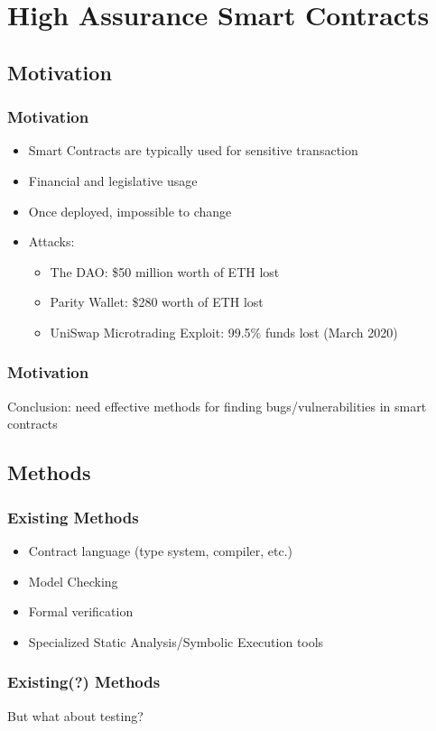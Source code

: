 \section{High Assurance Smart Contracts}

\subsection{Motivation}

\begin{frame}
\frametitle{Motivation}
\begin{itemize}
    \item Smart Contracts are typically used for sensitive transaction
    \item Financial and legislative usage
    \item Once deployed, impossible to change
    \item Attacks:
    \begin{itemize}
        \item The DAO: \$50 million worth of ETH lost
        \item Parity Wallet: \$280 worth of ETH lost
        \item UniSwap Microtrading Exploit: 99.5\% funds lost (March 2020)
    \end{itemize}
\end{itemize}
\end{frame}

\begin{frame}
\frametitle{Motivation}
Conclusion: need effective methods for finding bugs/vulnerabilities in smart contracts
\end{frame}


\subsection{Methods}
\begin{frame}
\frametitle{Existing Methods}
\begin{itemize}
    \item Contract language (type system, compiler, etc.)
    \item Model Checking
    \item Formal verification
    \item Specialized Static Analysis/Symbolic Execution tools
\end{itemize}
\end{frame}

\begin{frame}
\frametitle{Existing(?) Methods}
But what about testing?
\end{frame}